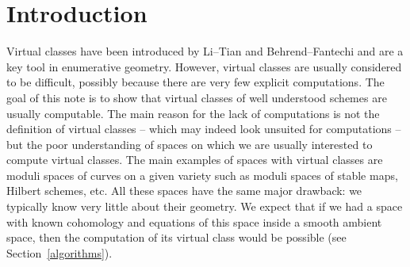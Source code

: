 \documentclass[pdftex]{sigma}
\numberwithin{equation}{section}
\newcommand{\Def}{\operatorname{Def}}
\theoremstyle{plain}
\theoremstyle{definition}
\theoremstyle{remark}
\newtheorem*{Qn}{Question}
\newcounter{passage}
\begin{document}
\section{Introduction}
Virtual classes have been introduced by Li--Tian \cite{litian} and Behrend--Fantechi \cite{BerFan} and are a key tool in enumerative geometry. However, virtual classes are usually considered to be difficult, possibly because there are very few explicit computations. The goal of this note is to show that virtual classes of well understood schemes are usually computable. The main reason for the lack of computations is not the definition of virtual classes -- which may indeed look unsuited for computations -- but the poor understanding of spaces on which we are usually interested to compute virtual classes. The main examples of spaces with virtual classes are moduli spaces of curves on a given variety such as moduli spaces of stable maps, Hilbert schemes, etc. All these spaces have the same major drawback: we typically know very little about their geometry. We expect that if we had a space with known cohomology and equations of this space inside a smooth ambient space, then the computation of its virtual class would be possible (see Section~\ref{algorithms}).

\end{document}
